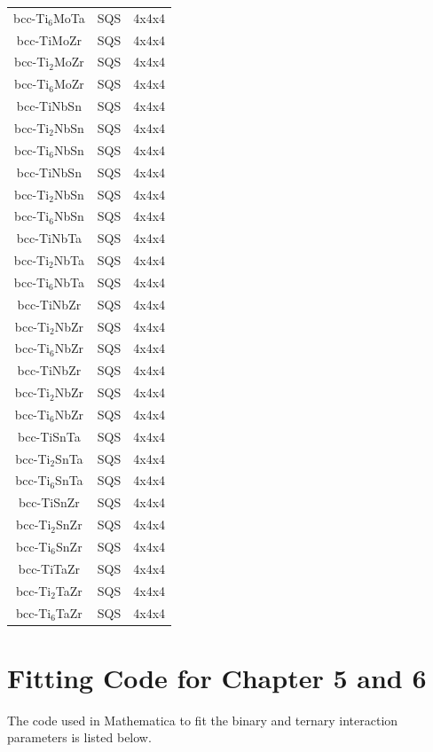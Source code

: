 \begin{longtable}[H]{ c c c }
	bcc-Ti$_{6}$MoTa & SQS & 4x4x4\\
	bcc-TiMoZr & SQS & 4x4x4\\
	bcc-Ti$_{2}$MoZr & SQS & 4x4x4\\
	bcc-Ti$_{6}$MoZr & SQS & 4x4x4\\
	bcc-TiNbSn & SQS & 4x4x4\\
	bcc-Ti$_{2}$NbSn & SQS & 4x4x4\\
	bcc-Ti$_{6}$NbSn & SQS & 4x4x4\\
	bcc-TiNbSn & SQS & 4x4x4\\
	bcc-Ti$_{2}$NbSn & SQS & 4x4x4\\
	bcc-Ti$_{6}$NbSn & SQS & 4x4x4\\
	bcc-TiNbTa & SQS & 4x4x4\\
	bcc-Ti$_{2}$NbTa & SQS & 4x4x4\\
	bcc-Ti$_{6}$NbTa & SQS & 4x4x4\\
	bcc-TiNbZr & SQS & 4x4x4\\
	bcc-Ti$_{2}$NbZr & SQS & 4x4x4\\
	bcc-Ti$_{6}$NbZr & SQS & 4x4x4\\
	bcc-TiNbZr & SQS & 4x4x4\\
	bcc-Ti$_{2}$NbZr & SQS & 4x4x4\\
	bcc-Ti$_{6}$NbZr & SQS & 4x4x4\\
	bcc-TiSnTa & SQS & 4x4x4\\
	bcc-Ti$_{2}$SnTa & SQS & 4x4x4\\
	bcc-Ti$_{6}$SnTa & SQS & 4x4x4\\
	bcc-TiSnZr & SQS & 4x4x4\\
	bcc-Ti$_{2}$SnZr & SQS & 4x4x4\\
	bcc-Ti$_{6}$SnZr & SQS & 4x4x4\\
	bcc-TiTaZr & SQS & 4x4x4\\
	bcc-Ti$_{2}$TaZr & SQS & 4x4x4\\
	bcc-Ti$_{6}$TaZr & SQS & 4x4x4\\
	\hline
\end{longtable}
\clearpage

\section{Fitting Code for Chapter 5 and 6}
The code used in Mathematica to fit the binary and ternary interaction parameters is listed below.

